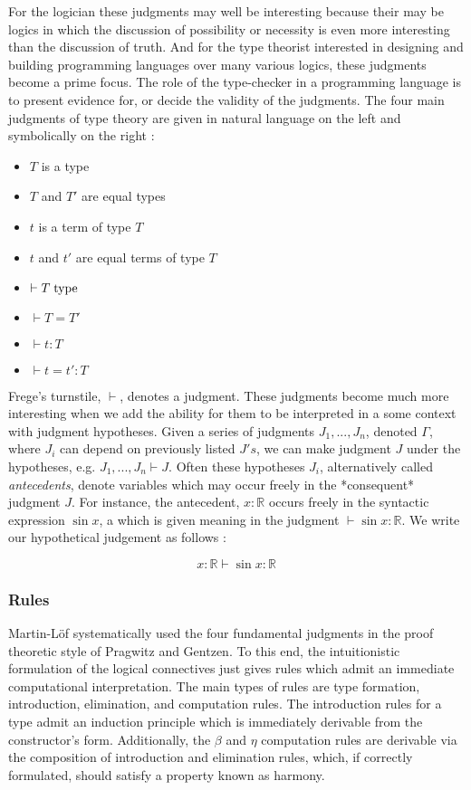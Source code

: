 For the logician these judgments may well be interesting because their may be
logics in which the discussion of possibility or necessity is even more
interesting than the discussion of truth. And for the type theorist interested
in designing and building programming languages over many various logics, these
judgments become a prime focus. The role of the type-checker in a programming
language is to present evidence for, or decide the validity of the judgments.
The four main judgments of type theory are given in natural language on the left
and symbolically on the right :

\begin{multicols}{2}
\begin{itemize}
\item $T$ is a type
\item $T$ and $T'$ are equal types
\item $t$ is a term of type $T$
\item $t$ and $t'$ are equal terms of type $T$
\item $\vdash T \; {\rm type}$
\item $\vdash T = T'$
\item $\vdash t:T$
\item $\vdash t = t':T$
\end{itemize}
\end{multicols}

Frege's turnstile, $\vdash$, denotes a judgment. These judgments become much more interesting when we add the ability for them to
be interpreted in a some context with judgment hypotheses. Given a series of
judgments $J_1,...,J_n$, denoted $\Gamma$, where $J_i$ can depend on previously
listed $J's$, we can make judgment $J$ under the hypotheses, e.g. $J_1,...,J_n
\vdash J$. Often these hypotheses $J_i$, alternatively called \emph{antecedents},
denote variables which may occur freely in the *consequent* judgment $J$. For
instance, the antecedent, $x : \mathbb{R}$ occurs freely in the syntactic
expression $\sin x$, a which is given meaning in the judgment $\vdash \sin x { :
} \mathbb{R}$. We write our hypothetical judgement as follows :

$$x : \mathbb{R} \vdash \sin x : \mathbb{R}$$



\subsubsection{Rules}

Martin-Löf systematically used the four fundamental judgments in the proof
theoretic style of Pragwitz and Gentzen. To this end, the intuitionistic
formulation of the logical connectives just gives rules which admit an immediate
computational interpretation. The main types of rules are type formation,
introduction, elimination, and computation rules. The introduction rules for a
type admit an induction principle which is immediately derivable from the
constructor's form. Additionally, the $\beta$ and $\eta$ computation rules are
derivable via the composition of introduction and elimination rules, which, if
correctly formulated, should satisfy a property known as harmony.

